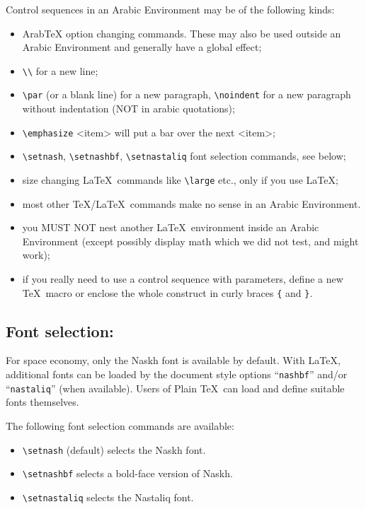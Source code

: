 \documentclass[pagesize=auto]{scrartcl}
\makeatletter
\newcommand*{\ArabTeX}{Arab\kern-0.12em\TeX\@\xspace}
\newcommand*{\meta}[1]{\textlangle\textsl{#1}\textrangle}
\def\ArabTeX{ArabTeX\xspace}%
\def\meta#1{<#1>}%
\makeatother
\begin{document}
Control sequences in an Arabic Environment may be of the following kinds:

\begin{itemize}
\item \ArabTeX option changing commands. These may also be used outside an 
  Arabic Environment and generally have a global effect; 
\item \verb+\\+ for a new line;
\item \verb+\par+ (or a blank line) for a new paragraph, \verb+\noindent+ for a new paragraph 
  without indentation (NOT in arabic quotations);
\item \verb+\emphasize+ \meta{item} will put a bar over the next \meta{item};
\item \verb+\setnash+, \verb+\setnashbf+, \verb+\setnastaliq+ font selection commands, see below;
\item size changing \LaTeX\ commands like \verb+\large+ etc., only if you use \LaTeX;
\item most other \TeX/\LaTeX\ commands make no sense in an Arabic Environment.
\item you MUST NOT nest another \LaTeX\ environment inside an Arabic Environment
  (except possibly display math which we did not test, and might work);
\item if you really need to use a control sequence with parameters, define a 
  new \TeX\ macro or enclose the whole construct in curly braces \verb+{+ and \verb+}+. 
\end{itemize}


\subsection{Font selection:}

For space economy, only the \textsf{Naskh} font is available by default. With \LaTeX, 
additional fonts can be loaded by the document style options ``\texttt{nashbf}'' 
and/or ``\texttt{nastaliq}'' (when available). Users of Plain \TeX\ can load and define 
suitable fonts themselves.

The following font selection commands are available:

\begin{itemize}
\item \verb+\setnash+ (default) selects the \textsf{Naskh} font.
\item \verb+\setnashbf+ selects a bold-face version of \textsf{Naskh}.
\item \verb+\setnastaliq+ selects the \textsf{Nastaliq} font.
\end{itemize}
\end{document}
